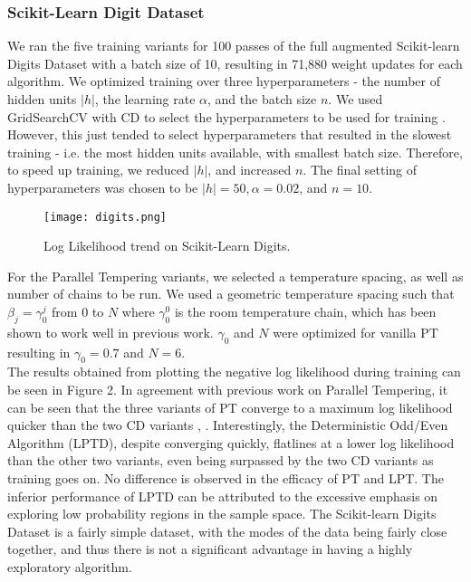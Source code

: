 \subsubsection{Scikit-Learn Digit Dataset}

We ran the five training variants for 100 passes of the full augmented Scikit-learn Digits Dataset with a batch size of 10, resulting in 71,880 weight updates for each algorithm. We optimized training over three hyperparameters - the number of hidden units $|h|$, the learning rate $\alpha$, and the batch size $n$. We used GridSearchCV with CD to select the hyperparameters to be used for training \cite{pedregosa2011scikit}. However, this just tended to select hyperparameters that resulted in the slowest training - i.e. the most hidden units available, with smallest batch size. Therefore, to speed up training, we reduced $|h|$, and increased $n$. The final setting of hyperparameters was chosen to be $|h|=50, \alpha = 0.02$, and $n=10$.\\
\begin{figure}[ht!]
	\centering
	\texttt{[image: digits.png]}
\caption{Log Likelihood trend on Scikit-Learn Digits.}
\end{figure}
For the Parallel Tempering variants, we selected a temperature spacing, as well as number of chains to be run. We used a geometric temperature spacing such that $\beta_j = \gamma_{0}^j$ from $0$ to $N$ where $\gamma_0^0$ is the room temperature chain, which has been shown to work well in previous work. $\gamma_0$ and $N$ were optimized for vanilla PT resulting in $\gamma_0 = 0.7$ and $N=6$.\\

The results obtained from plotting the negative log likelihood during training can be seen in Figure 2. In agreement with previous work on Parallel Tempering, it can be seen that the three variants of PT converge to a maximum log likelihood quicker than the two CD variants \cite{desjardins2010tempered}, \cite{fischer2014training}. Interestingly, the Deterministic Odd/Even Algorithm (LPTD), despite converging quickly, flatlines at a lower log likelihood than the other two variants, even being surpassed by the two CD variants as training goes on. No difference is observed in the efficacy of PT and LPT. The inferior performance of LPTD can be attributed to the excessive emphasis on exploring low probability regions in the sample space. The Scikit-learn Digits Dataset is a fairly simple dataset, with the modes of the data being fairly close together, and thus there is not a significant advantage in having a highly exploratory algorithm.\\

